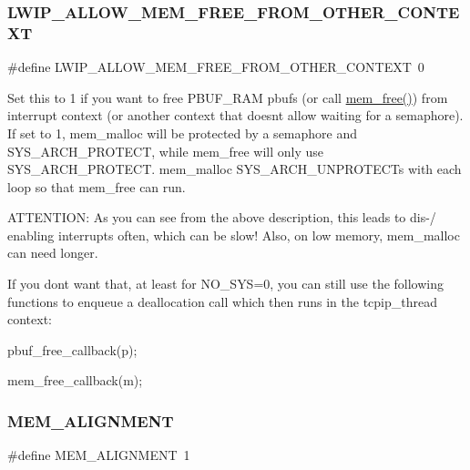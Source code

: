 \subsubsection{\texorpdfstring{L\+W\+I\+P\+\_\+\+A\+L\+L\+O\+W\+\_\+\+M\+E\+M\+\_\+\+F\+R\+E\+E\+\_\+\+F\+R\+O\+M\+\_\+\+O\+T\+H\+E\+R\+\_\+\+C\+O\+N\+T\+E\+XT}{LWIP\_ALLOW\_MEM\_FREE\_FROM\_OTHER\_CONTEXT}\hspace{0.1cm}{\footnotesize\ttfamily [2/2]}}
{\footnotesize\ttfamily \#define L\+W\+I\+P\+\_\+\+A\+L\+L\+O\+W\+\_\+\+M\+E\+M\+\_\+\+F\+R\+E\+E\+\_\+\+F\+R\+O\+M\+\_\+\+O\+T\+H\+E\+R\+\_\+\+C\+O\+N\+T\+E\+XT~0}

Set this to 1 if you want to free P\+B\+U\+F\+\_\+\+R\+AM pbufs (or call \hyperlink{native_2lwip_2src_2core_2mem_8c_a65169147c44e9db60d997819af9b455c}{mem\+\_\+free()}) from interrupt context (or another context that doesn\textquotesingle{}t allow waiting for a semaphore). If set to 1, mem\+\_\+malloc will be protected by a semaphore and S\+Y\+S\+\_\+\+A\+R\+C\+H\+\_\+\+P\+R\+O\+T\+E\+CT, while mem\+\_\+free will only use S\+Y\+S\+\_\+\+A\+R\+C\+H\+\_\+\+P\+R\+O\+T\+E\+CT. mem\+\_\+malloc S\+Y\+S\+\_\+\+A\+R\+C\+H\+\_\+\+U\+N\+P\+R\+O\+T\+E\+C\+Ts with each loop so that mem\+\_\+free can run.

A\+T\+T\+E\+N\+T\+I\+ON\+: As you can see from the above description, this leads to dis-\// enabling interrupts often, which can be slow! Also, on low memory, mem\+\_\+malloc can need longer.

If you don\textquotesingle{}t want that, at least for N\+O\+\_\+\+S\+YS=0, you can still use the following functions to enqueue a deallocation call which then runs in the tcpip\+\_\+thread context\+:
\begin{DoxyItemize}
\item pbuf\+\_\+free\+\_\+callback(p);
\item mem\+\_\+free\+\_\+callback(m); 
\end{DoxyItemize}\mbox{\label{group__lwip__opts__mem_ga97343214666ee6dcb18c0bd77b441ea7}} 
\subsubsection{\texorpdfstring{M\+E\+M\+\_\+\+A\+L\+I\+G\+N\+M\+E\+NT}{MEM\_ALIGNMENT}\hspace{0.1cm}{\footnotesize\ttfamily [1/2]}}
{\footnotesize\ttfamily \#define M\+E\+M\+\_\+\+A\+L\+I\+G\+N\+M\+E\+NT~1}

